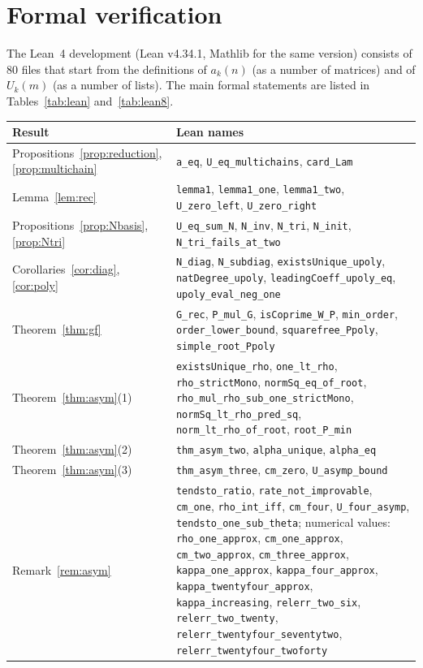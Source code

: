 \documentclass[11pt]{amsart}
\theoremstyle{definition}
\newcommand{\lean}[1]{\texttt{#1}}
\begin{document}
\section{Formal verification}\label{sec:lean}

The Lean~4 development (Lean v4.34.1, Mathlib for the same version) consists of 80 files that start from the definitions of $a_k(n)$ (as a number of matrices) and of $U_k(m)$ (as a number of lists). The main formal statements are listed in Tables~\ref{tab:lean} and~\ref{tab:lean8}.

\begin{table}[t]
\centering
\footnotesize
\renewcommand{\arraystretch}{0.90}
\begin{tabular}{l>{\raggedright\arraybackslash}p{}}
\toprule
Result & Lean names\\
\midrule
Propositions~\ref{prop:reduction}, \ref{prop:multichain} & \lean{a\_eq}, \lean{U\_eq\_multichains}, \lean{card\_Lam}\\
Lemma~\ref{lem:rec} & \lean{lemma1}, \lean{lemma1\_one}, \lean{lemma1\_two}, \lean{U\_zero\_left}, \lean{U\_zero\_right}\\
Propositions~\ref{prop:Nbasis}, \ref{prop:Ntri} & \lean{U\_eq\_sum\_N}, \lean{N\_inv}, \lean{N\_tri}, \lean{N\_init}, \lean{N\_tri\_fails\_at\_two}\\
Corollaries~\ref{cor:diag}, \ref{cor:poly} & \lean{N\_diag}, \lean{N\_subdiag}, \lean{existsUnique\_upoly}, \lean{natDegree\_upoly}, \lean{leadingCoeff\_upoly\_eq}, \lean{upoly\_eval\_neg\_one}\\
Theorem~\ref{thm:gf} & \lean{G\_rec}, \lean{P\_mul\_G}, \lean{isCoprime\_W\_P}, \lean{min\_order}, \lean{order\_lower\_bound}, \lean{squarefree\_Ppoly}, \lean{simple\_root\_Ppoly}\\
Theorem~\ref{thm:asym}(1) & \lean{existsUnique\_rho}, \lean{one\_lt\_rho}, \lean{rho\_strictMono}, \lean{normSq\_eq\_of\_root}, \lean{rho\_mul\_rho\_sub\_one\_strictMono}, \lean{normSq\_lt\_rho\_pred\_sq}, \lean{norm\_lt\_rho\_of\_root}, \lean{root\_P\_min}\\
Theorem~\ref{thm:asym}(2) & \lean{thm\_asym\_two}, \lean{alpha\_unique}, \lean{alpha\_eq}\\
Theorem~\ref{thm:asym}(3) & \lean{thm\_asym\_three}, \lean{cm\_zero}, \lean{U\_asymp\_bound}\\
Remark~\ref{rem:asym} & \lean{tendsto\_ratio}, \lean{rate\_not\_improvable}, \lean{cm\_one}, \lean{rho\_int\_iff}, \lean{cm\_four}, \lean{U\_four\_asymp}, \lean{tendsto\_one\_sub\_theta}; numerical values: \lean{rho\_one\_approx}, \lean{cm\_one\_approx}, \lean{cm\_two\_approx}, \lean{cm\_three\_approx}, \lean{kappa\_one\_approx}, \lean{kappa\_four\_approx}, \lean{kappa\_twentyfour\_approx}, \lean{kappa\_increasing}, \lean{relerr\_two\_six}, \lean{relerr\_two\_twenty}, \lean{relerr\_twentyfour\_seventytwo}, \lean{relerr\_twentyfour\_twoforty}\\

\end{tabular}
\end{table}
\end{document}
